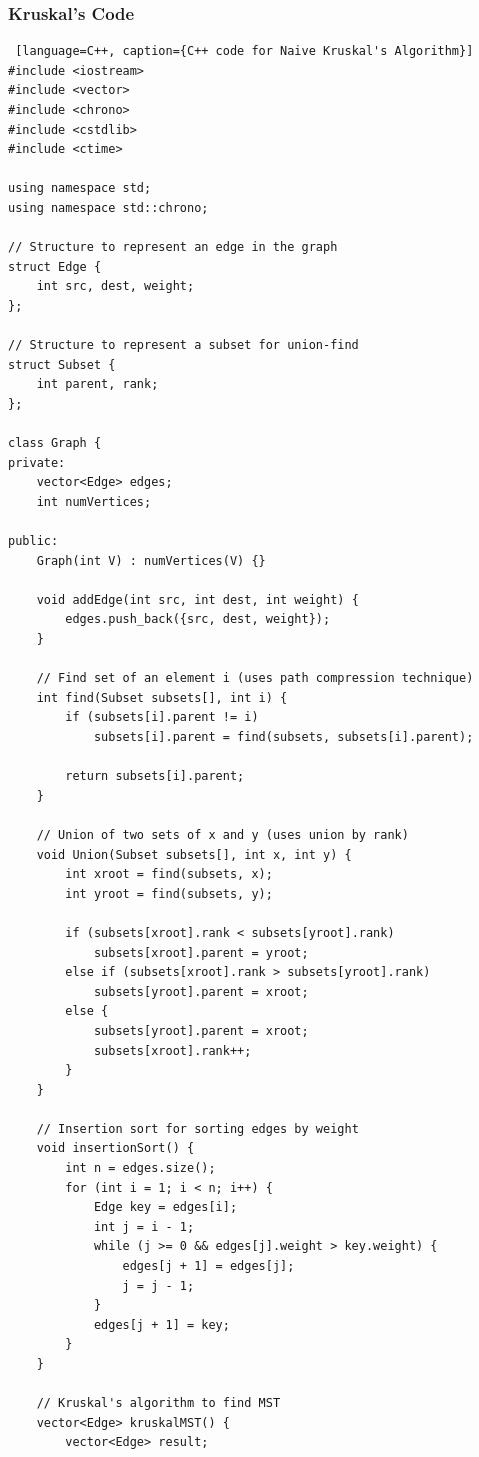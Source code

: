 \documentclass[a4paper, 10pt, twocolumn]{article}
\begin{document}
\subsubsection{Kruskal's Code}
\begin{lstlisting} [language=C++, caption={C++ code for Naive Kruskal's Algorithm}]
#include <iostream>
#include <vector>
#include <chrono>
#include <cstdlib>
#include <ctime>

using namespace std;
using namespace std::chrono;

// Structure to represent an edge in the graph
struct Edge {
    int src, dest, weight;
};

// Structure to represent a subset for union-find
struct Subset {
    int parent, rank;
};

class Graph {
private:
    vector<Edge> edges;
    int numVertices;

public:
    Graph(int V) : numVertices(V) {}

    void addEdge(int src, int dest, int weight) {
        edges.push_back({src, dest, weight});
    }

    // Find set of an element i (uses path compression technique)
    int find(Subset subsets[], int i) {
        if (subsets[i].parent != i)
            subsets[i].parent = find(subsets, subsets[i].parent);

        return subsets[i].parent;
    }

    // Union of two sets of x and y (uses union by rank)
    void Union(Subset subsets[], int x, int y) {
        int xroot = find(subsets, x);
        int yroot = find(subsets, y);

        if (subsets[xroot].rank < subsets[yroot].rank)
            subsets[xroot].parent = yroot;
        else if (subsets[xroot].rank > subsets[yroot].rank)
            subsets[yroot].parent = xroot;
        else {
            subsets[yroot].parent = xroot;
            subsets[xroot].rank++;
        }
    }

    // Insertion sort for sorting edges by weight
    void insertionSort() {
        int n = edges.size();
        for (int i = 1; i < n; i++) {
            Edge key = edges[i];
            int j = i - 1;
            while (j >= 0 && edges[j].weight > key.weight) {
                edges[j + 1] = edges[j];
                j = j - 1;
            }
            edges[j + 1] = key;
        }
    }

    // Kruskal's algorithm to find MST
    vector<Edge> kruskalMST() {
        vector<Edge> result;


\end{lstlisting}
\end{document}
